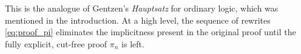 \documentclass[english,letter paper,12pt,reqno]{article}
\theoremstyle{example}
\numberwithin{equation}{section}
\begin{document}
This is the analogue of Gentzen's \emph{Hauptsatz} for ordinary logic, which was mentioned in the introduction. At a high level, the sequence of rewrites \eqref{eq:proof_pi} eliminates the implicitness present in the original proof until the fully explicit, cut-free proof $\pi_n$ is left. %
\end{document}

